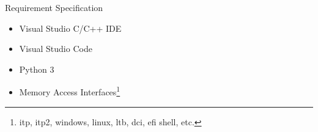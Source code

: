 \begin{frame}{Requirement Specification}
    \begin{itemize}
        \item Visual Studio C/C++ IDE
        \item Visual Studio Code
        \item Python 3
        \item Memory Access Interfaces\footnote{itp, itp2, windows, linux, ltb, dci, efi shell, etc.}
    \end{itemize}
\end{frame}